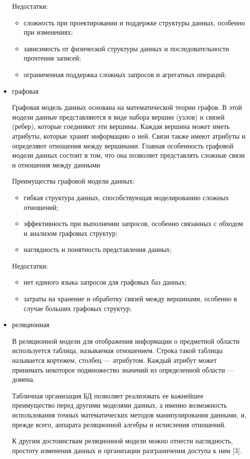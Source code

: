 \begin{itemize}
Недостатки:
\begin{itemize}
	\item сложность при проектировании и поддержке структуры данных, особенно при изменениях;
	\item зависимость от физической структуры данных и последовательности прочтения записей;
	\item ограниченная поддержка сложных запросов и агрегатных операций;
\end{itemize}

	\item графовая
	
Графовая модель данных основана на математической теории графов. В этой модели данные представляются в виде набора вершин (узлов) и связей (ребер), которые соединяют эти вершины. Каждая вершина может иметь атрибуты, которые хранят информацию о ней. Связи также имеют атрибуты и определяют отношения между вершинами. Главная особенность графовой модели данных состоит в том, что она позволяет представлять сложные связи и отношения между данными

Преимущества графовой модели данных:
\begin{itemize}
	\item гибкая структура данных, способствующая моделированию сложных отношений;
	\item эффективность при выполнении запросов, особенно связанных с обходом и анализом графовых структур;
	\item наглядность и понятность представления данных;
\end{itemize}

Недостатки:
\begin{itemize}
	\item нет единого языка запросов для графовых баз данных;
	\item затраты на хранение и обработку связей между вершинами, особенно в случае больших графовых структур;
\end{itemize}

	\item реляционная
	
В реляционной модели для отображения информации о предметной
области используется таблица, называемая отношением. Строка такой таблицы называется кортежем, столбец --- атрибутом. Каждый атрибут может принимать некоторое подмножество значений из определенной области --- домена.

Табличная организация БД позволяет реализовать ее важнейшее преимущество перед другими моделями данных, а именно возможность использования точных математических методов манипулирования данными,
и, прежде всего, аппарата реляционной алгебры и исчисления отношений.

К другим достоинствам реляционной модели можно отнести наглядность,
простоту изменения данных и организации разграничения доступа к ним [3]. 
\end{itemize}

